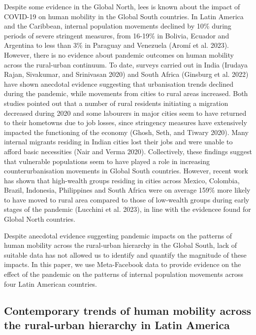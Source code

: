 \documentclass[11pt,letterpaper]{article}
\begin{document}
Despite some evidence in the Global North, lees is known about the
impact of COVID-19 on human mobility in the Global South countries. In
Latin America and the Caribbean, internal population movements declined
by 10\% during periods of severe stringent measures, from 16-19\% in
Bolivia, Ecuador and Argentina to less than 3\% in Paraguay and
Venezuela (Aromí et al. 2023). However, there is no evidence about
pandemic outcomes on human mobility across the rural-urban continuum. To
date, surveys carried out in India (Irudaya Rajan, Sivakumar, and
Srinivasan 2020) and South Africa (Ginsburg et al. 2022) have shown
anecdotal evidence suggesting that urbanisation trends declined during
the pandemic, while movements from cities to rural areas increased. Both
studies pointed out that a number of rural residents initiating a
migration decreased during 2020 and some labourers in major cities seem
to have returned to their hometowns due to job losses, since stringency
measures have extensively impacted the functioning of the economy
(Ghosh, Seth, and Tiwary 2020). Many internal migrants residing in
Indian cities lost their jobs and were unable to afford basic
necessities (Nair and Verma 2020). Collectively, these findings suggest
that vulnerable populations seem to have played a role in increasing
counterurbanisation movements in Global South countries. However, recent
work has shown that high-wealth groups residing in cities across Mexico,
Colombia, Brazil, Indonesia, Philippines and South Africa were on
average 159\% more likely to have moved to rural area compared to those
of low-wealth groups during early stages of the pandemic (Lucchini et
al. 2023), in line with the evidencee found for Global North countries.

Despite anecdotal evidence suggesting pandemic impacts on the patterns
of human mobility across the rural-urban hierarchy in the Global South,
lack of suitable data has not allowed us to identify and quantify the
magnitude of these impacts. In this paper, we use Meta-Facebook data to
provide evidence on the effect of the pandemic on the patterns of
internal population movements across four Latin American countries.

\subsection{Contemporary trends of human mobility across the rural-urban hierarchy in Latin America}
\end{document}
